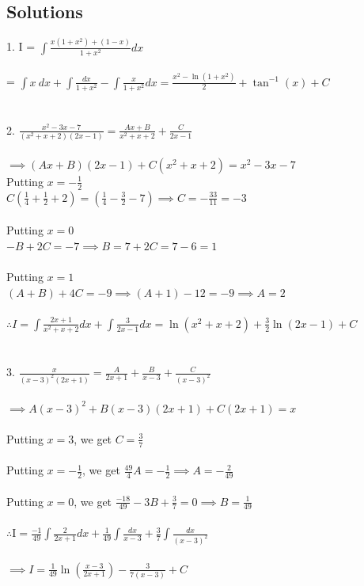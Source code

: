 \documentclass[14pt]{article}
\begin{document}
	\subsection{Solutions}
	1. I = $\displaystyle \int \frac{x(1+x^2)+(1-x)}{1+x^2}dx$
	\\ \\ = $\displaystyle \int x \ dx + \int\frac{dx}{1+x^2} -\int \frac{x}{1+x^2}dx = \boxed{\frac{x^2-\ln(1+x^2)}{2}+\tan^{-1}(x)+C}$ \\ \\ \\
	2. $\displaystyle \frac{x^2-3x-7}{(x^2+x+2)(2x-1)} = \frac{Ax+B}{x^2+x+2}+\frac{C}{2x-1}$ \\ \\ $\implies (Ax+B)(2x-1)+C(x^2+x+2) = x^2-3x-7$ \\
	Putting $\displaystyle x = -\frac{1}{2}$ \\
	$\displaystyle C \left(\frac{1}{4}+\frac{1}{2}+2\right) = \left(\frac{1}{4}-\frac{3}{2}-7\right) \implies C = -\frac{33}{11} = -3$ \\ \\
	Putting $x = 0$ \\
	$-B+2C=-7 \implies B = 7+2C = 7-6 = 1$ \\ \\
	Putting $x = 1$ \\
	$(A+B)+4C=-9 \implies (A+1)-12=-9 \implies A = 2$ \\ \\
	$\displaystyle \therefore I = \int \frac{2x+1}{x^2+x+2} dx + \int \frac{3}{2x-1}dx = \boxed{\ln(x^2+x+2)+\frac{3}{2}\ln(2x-1)+C}$ \\ \\ \\
	3. $\displaystyle \frac{x}{(x-3)^2(2x+1)} = \frac{A}{2x+1}+\frac{B}{x-3}+\frac{C}{(x-3)^2}$ \\ \\
	$\implies A(x-3)^2+B(x-3)(2x+1)+C(2x+1)=x$ \\ \\
	Putting $x = 3$, we get $\displaystyle C = \frac{3}{7}$ \\ \\
	Putting $\displaystyle x = -\frac{1}{2}$, we get $\displaystyle \frac{49}{4}A = -\frac{1}{2} \implies A = -\frac{2}{49}$ \\ \\
	Putting $x = 0$, we get $\displaystyle \frac{-18}{49}-3B+\frac{3}{7} = 0 \implies B = \frac{1}{49}$ \\ \\
	$\displaystyle \therefore \text{I} = \frac{-1}{49}\int \frac{2}{2x+1}dx + \frac{1}{49} \int \frac{dx}{x-3} + \frac{3}{7} \int \frac{dx}{(x-3)^2}$ \\ \\
	$\displaystyle \implies I = \boxed{\frac{1}{49}\ln\left(\frac{x-3}{2x+1}\right) - \frac{3}{7(x-3)}+C}$
\end{document}
